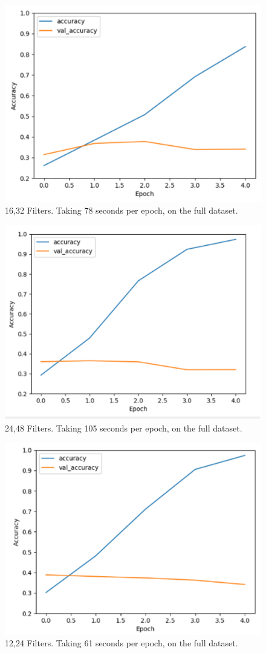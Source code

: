 \begin{figure}[H]
\centering
\includegraphics[scale=0.8]{Media/Testing/fig11.png}
\caption{16,32 Filters. Taking 78 seconds per epoch, on the full dataset.}
\label{fig11}
\end{figure}

\begin{figure}[H]
\centering
\includegraphics[scale=0.8]{Media/Testing/fig12.png}
\caption{24,48 Filters. Taking 105 seconds per epoch, on the full dataset.}
\label{fig12}
\end{figure}

\begin{figure}[H]
\centering
\includegraphics[scale=0.8]{Media/Testing/fig13.png}
\caption{12,24 Filters. Taking 61 seconds per epoch, on the full dataset.}
\label{fig13}
\end{figure}